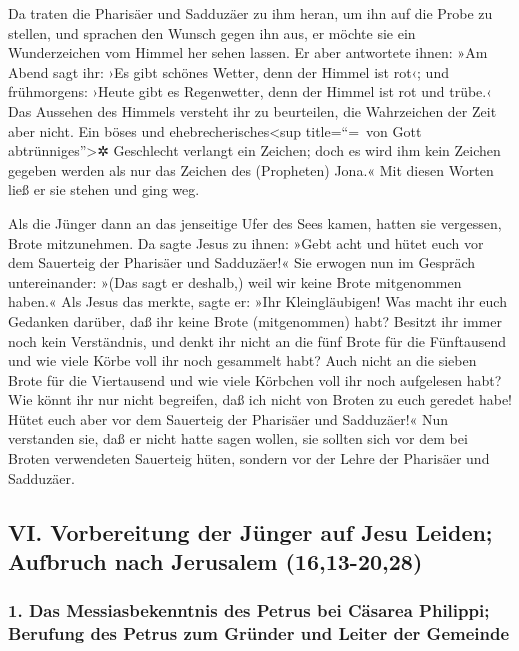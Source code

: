  Da traten die Pharisäer und Sadduzäer zu ihm heran, um
ihn auf die Probe zu stellen, und sprachen den Wunsch gegen ihn aus, er
möchte sie ein Wunderzeichen vom Himmel her sehen lassen. 
Er aber antwortete ihnen: »Am Abend sagt ihr: ›Es gibt schönes Wetter,
denn der Himmel ist rot‹;  und frühmorgens: ›Heute gibt es
Regenwetter, denn der Himmel ist rot und trübe.‹ Das Aussehen des
Himmels versteht ihr zu beurteilen, die Wahrzeichen der Zeit aber nicht.
 Ein böses und ehebrecherisches\textless sup title=``=~von
Gott abtrünniges''\textgreater✲ Geschlecht verlangt ein Zeichen; doch es
wird ihm kein Zeichen gegeben werden als nur das Zeichen des (Propheten)
Jona.« Mit diesen Worten ließ er sie stehen und ging weg.

 Als die Jünger dann an das jenseitige Ufer des Sees
kamen, hatten sie vergessen, Brote mitzunehmen.  Da sagte
Jesus zu ihnen: »Gebt acht und hütet euch vor dem Sauerteig der
Pharisäer und Sadduzäer!«  Sie erwogen nun im Gespräch
untereinander: »(Das sagt er deshalb,) weil wir keine Brote mitgenommen
haben.«  Als Jesus das merkte, sagte er: »Ihr
Kleingläubigen! Was macht ihr euch Gedanken darüber, daß ihr keine Brote
(mitgenommen) habt?  Besitzt ihr immer noch kein
Verständnis, und denkt ihr nicht an die fünf Brote für die Fünftausend
und wie viele Körbe voll ihr noch gesammelt habt?  Auch
nicht an die sieben Brote für die Viertausend und wie viele Körbchen
voll ihr noch aufgelesen habt?  Wie könnt ihr nur nicht
begreifen, daß ich nicht von Broten zu euch geredet habe! Hütet euch
aber vor dem Sauerteig der Pharisäer und Sadduzäer!«  Nun
verstanden sie, daß er nicht hatte sagen wollen, sie sollten sich vor
dem bei Broten verwendeten Sauerteig hüten, sondern vor der Lehre der
Pharisäer und Sadduzäer.

\hypertarget{vi.-vorbereitung-der-juxfcnger-auf-jesu-leiden-aufbruch-nach-jerusalem-1613-2028}{%
\subsection{VI. Vorbereitung der Jünger auf Jesu Leiden; Aufbruch nach
Jerusalem
(16,13-20,28)}\label{vi.-vorbereitung-der-juxfcnger-auf-jesu-leiden-aufbruch-nach-jerusalem-1613-2028}}

\hypertarget{das-messiasbekenntnis-des-petrus-bei-cuxe4sarea-philippi-berufung-des-petrus-zum-gruxfcnder-und-leiter-der-gemeinde}{%
\subsubsection{1. Das Messiasbekenntnis des Petrus bei Cäsarea Philippi;
Berufung des Petrus zum Gründer und Leiter der
Gemeinde}\label{das-messiasbekenntnis-des-petrus-bei-cuxe4sarea-philippi-berufung-des-petrus-zum-gruxfcnder-und-leiter-der-gemeinde}}

